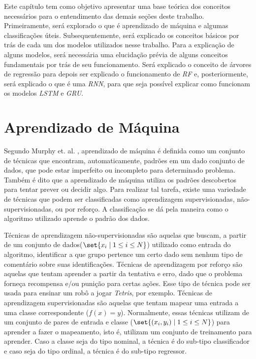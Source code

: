 Este capítulo tem como objetivo apresentar uma base teórica dos conceitos necessários para o entendimento das demais seções deste trabalho. Primeiramente, será explorado o que é aprendizado de máquina e algumas classificações úteis. Subsequentemente, será explicado os conceitos básicos por trás de cada um dos modelos utilizados nesse trabalho. Para a explicação de alguns modelos, será necessária uma elucidação prévia de alguns conceitos fundamentais por trás de seu funcionamento. Será explicado o conceito de árvores de regressão para depois ser explicado o funcionamento de \textit{\acrshort{RF}} e, posteriormente, será explicado o que é uma \textit{\acrshort{RNN}}, para que seja possível explicar como funcionam os modelos \textit{\acrshort{LSTM}} e \textit{\acrshort{GRU}}.

\section{Aprendizado de Máquina}

Segundo Murphy et. al. \cite{murphy2012machine}, aprendizado de máquina é definida como um conjunto de técnicas que encontram, automaticamente, padrões em um dado conjunto de dados, que pode estar imperfeito ou incompleto para determinado problema. Também é dito que a aprendizado de máquina utiliza os padrões descobertos para tentar prever ou decidir algo. Para realizar tal tarefa, existe uma variedade de técnicas que podem ser classificadas como aprendizagem supervisionadas, não-supervisionadas, ou por reforço. A classificação se dá pela maneira como o algoritmo utilizado aprende o padrão dos dados.

Técnicas de aprendizagem não-supervisionadas são aquelas que buscam, a partir de um conjunto de dados(\(\set{x_i \mid 1\leq i\leq N}\)) utilizado como entrada do algoritmo, identificar a que grupo pertence um certo dado sem nenhum tipo de comentário sobre suas identificações. Técnicas de aprendizagem por reforço são aquelas que tentam aprender a partir da tentativa e erro, dado que o problema forneça recompensa e/ou punição para certas ações. Esse tipo de técnica pode ser usada para ensinar um robô a jogar \textit{Tetris}, por exemplo. Técnicas de aprendizagem supervisionadas são aquelas que tentam mapear uma entrada a uma classe correspondente (\(f(x) = y\)). Normalmente, essas técnicas utilizam de um conjunto de pares de entrada e classe (\(\set{(x_i, y_i) \mid 1\leq i\leq N}\)) para aprender a fazer o mapeamento, isto é, utilizam um conjunto de treinamento para aprender. Caso a classe seja do tipo nominal, a técnica é do sub-tipo classificador e caso seja do tipo ordinal, a técnica é do sub-tipo regressor.

